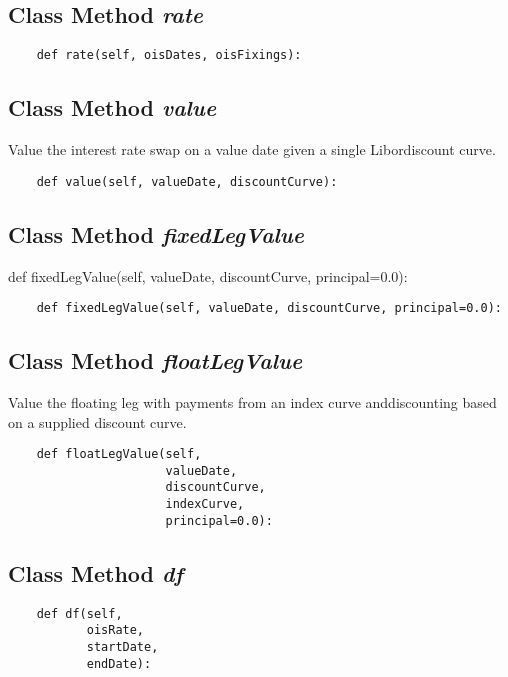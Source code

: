 \documentclass[twoside,11pt]{book}
\begin{document}
\subsection{Class Method {\it rate}}


\begin{lstlisting}
    def rate(self, oisDates, oisFixings):
\end{lstlisting}

\subsection{Class Method {\it value}}
Value the interest rate swap on a value date given a single Libordiscount curve. 

\begin{lstlisting}
    def value(self, valueDate, discountCurve):
\end{lstlisting}

\subsection{Class Method {\it fixedLegValue}}
def fixedLegValue(self, valueDate, discountCurve, principal=0.0):

\begin{lstlisting}
    def fixedLegValue(self, valueDate, discountCurve, principal=0.0):
\end{lstlisting}

\subsection{Class Method {\it floatLegValue}}
Value the floating leg with payments from an index curve anddiscounting based on a supplied discount curve. 

\begin{lstlisting}
    def floatLegValue(self,
                      valueDate,
                      discountCurve,
                      indexCurve,
                      principal=0.0):
\end{lstlisting}

\subsection{Class Method {\it df}}


\begin{lstlisting}
    def df(self,
           oisRate,
           startDate,
           endDate):
\end{lstlisting}
\end{document}
